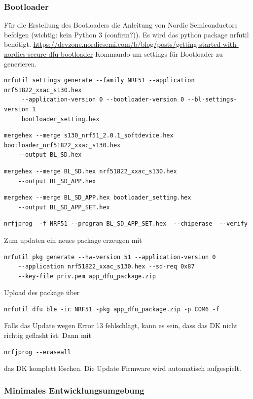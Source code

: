 \documentclass[11pt,ngerman]{scrartcl} %
\begin{document}
\subsubsection{Bootloader}
Für die Erstellung des Bootloaders die Anleitung von Nordic Semiconductors befolgen (wichtig: kein Python 3 (confirm?)). Es wird das python package nrfutil benötigt.
\url{https://devzone.nordicsemi.com/b/blog/posts/getting-started-with-nordics-secure-dfu-bootloader}
Kommando um settings für Bootloader zu generieren.
\begin{verbatim}
nrfutil settings generate --family NRF51 --application nrf51822_xxac_s130.hex 
     --application-version 0 --bootloader-version 0 --bl-settings-version 1
     bootloader_setting.hex
\end{verbatim}
\begin{verbatim}
mergehex --merge s130_nrf51_2.0.1_softdevice.hex bootloader_nrf51822_xxac_s130.hex 
	--output BL_SD.hex
\end{verbatim}
\begin{verbatim}
mergehex --merge BL_SD.hex nrf51822_xxac_s130.hex 
	--output BL_SD_APP.hex
\end{verbatim}
\begin{verbatim}
mergehex --merge BL_SD_APP.hex bootloader_setting.hex 
	--output BL_SD_APP_SET.hex
\end{verbatim}
\begin{verbatim}
nrfjprog  -f NRF51 --program BL_SD_APP_SET.hex  --chiperase  --verify
\end{verbatim}
Zum updaten ein neues package erzeugen mit
\begin{verbatim}
nrfutil pkg generate --hw-version 51 --application-version 0 
	--application nrf51822_xxac_s130.hex --sd-req 0x87 
	--key-file priv.pem app_dfu_package.zip
\end{verbatim}
Upload des package über
\begin{verbatim}
nrfutil dfu ble -ic NRF51 -pkg app_dfu_package.zip -p COM6 -f
\end{verbatim}
Falls das Update wegen Error 13 fehlschlägt, kann es sein, dass das DK nicht richtig geflasht ist. Dann mit 
\begin{verbatim}
nrfjprog --eraseall
\end{verbatim}
das DK komplett löschen. Die Update Firmware wird automatisch aufgespielt.

\subsubsection{Minimales Entwicklungsumgebung}
\label{sec:minimal-setup}
\end{document}

